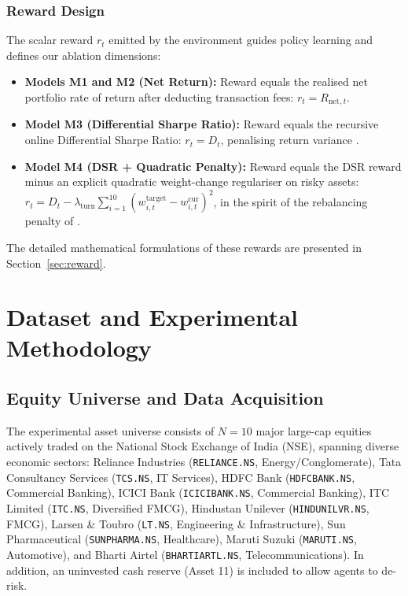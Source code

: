 \documentclass[11pt,a4paper]{article}
\numberwithin{equation}{section}
\numberwithin{table}{section}
\numberwithin{figure}{section}
\numberwithin{algorithm}{section}
\newcommand{\Rnet}{R_{\mathrm{net}}}
\begin{document}
\subsubsection{Reward Design}
The scalar reward $r_t$ emitted by the environment guides policy learning and defines our ablation dimensions:
\begin{itemize}
\item \textbf{Models M1 and M2 (Net Return):} Reward equals the realised net portfolio rate of return after deducting transaction fees: $r_t=\Rnet{}_{,t}$.
\item \textbf{Model M3 (Differential Sharpe Ratio):} Reward equals the recursive online Differential Sharpe Ratio: $r_t=D_t$, penalising return variance \cite{millea2021}.
\item \textbf{Model M4 (DSR + Quadratic Penalty):} Reward equals the DSR reward minus an explicit quadratic weight-change regulariser on risky assets: $r_t=D_t-\lambda_{\mathrm{turn}}\sum_{i=1}^{10}(w_{i,t}^{\mathrm{target}}-w_{i,t}^{\mathrm{cur}})^2$, in the spirit of the rebalancing penalty of \cite{wang2025}.
\end{itemize}
The detailed mathematical formulations of these rewards are presented in Section~\ref{sec:reward}.

\section{Dataset and Experimental Methodology}\label{ch:data}
\subsection{Equity Universe and Data Acquisition}
The experimental asset universe consists of $N=10$ major large-cap equities actively traded on the National Stock Exchange of India (NSE), spanning diverse economic sectors: Reliance Industries (\texttt{RELIANCE.NS}, Energy/Conglomerate), Tata Consultancy Services (\texttt{TCS.NS}, IT Services), HDFC Bank (\texttt{HDFCBANK.NS}, Commercial Banking), ICICI Bank (\texttt{ICICIBANK.NS}, Commercial Banking), ITC Limited (\texttt{ITC.NS}, Diversified FMCG), Hindustan Unilever (\texttt{HINDUNILVR.NS}, FMCG), Larsen \& Toubro (\texttt{LT.NS}, Engineering \& Infrastructure), Sun Pharmaceutical (\texttt{SUNPHARMA.NS}, Healthcare), Maruti Suzuki (\texttt{MARUTI.NS}, Automotive), and Bharti Airtel (\texttt{BHARTIARTL.NS}, Telecommunications). In addition, an uninvested cash reserve (Asset 11) is included to allow agents to de-risk.
\end{document}
